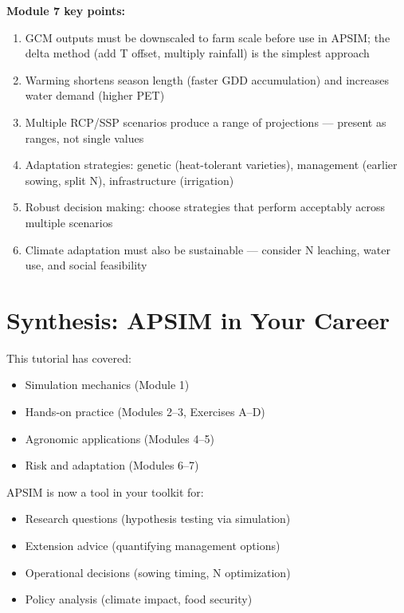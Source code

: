 \begin{keyconceptbox}
\textbf{Module 7 key points:}
\begin{enumerate}
  \item GCM outputs must be downscaled to farm scale before use in APSIM; the delta method (add T offset, multiply rainfall) is the simplest approach
  \item Warming shortens season length (faster GDD accumulation) and increases water demand (higher PET)
  \item Multiple RCP/SSP scenarios produce a range of projections --- present as ranges, not single values
  \item Adaptation strategies: genetic (heat-tolerant varieties), management (earlier sowing, split N), infrastructure (irrigation)
  \item Robust decision making: choose strategies that perform acceptably across multiple scenarios
  \item Climate adaptation must also be sustainable --- consider N leaching, water use, and social feasibility
\end{enumerate}
\end{keyconceptbox}

\section{Synthesis: APSIM in Your Career}

This tutorial has covered:
\begin{itemize}
  \item Simulation mechanics (Module 1)
  \item Hands-on practice (Modules 2--3, Exercises A--D)
  \item Agronomic applications (Modules 4--5)
  \item Risk and adaptation (Modules 6--7)
\end{itemize}

APSIM is now a tool in your toolkit for:
\begin{itemize}
  \item Research questions (hypothesis testing via simulation)
  \item Extension advice (quantifying management options)
  \item Operational decisions (sowing timing, N optimization)
  \item Policy analysis (climate impact, food security)
\end{itemize}

